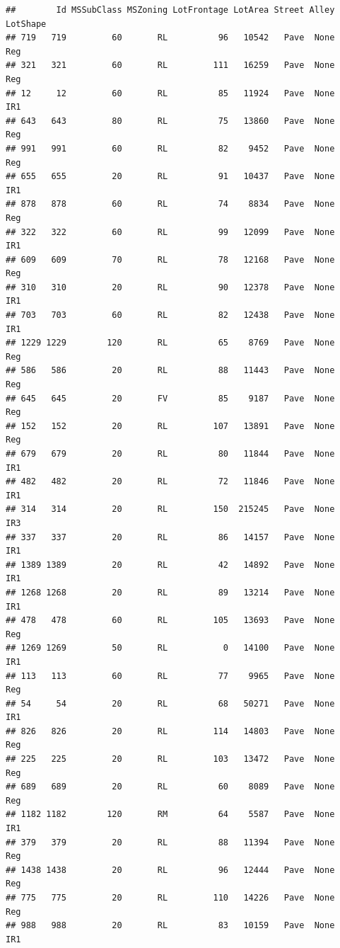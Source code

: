 \documentclass[]{article}
\begin{document}
\begin{verbatim}
##        Id MSSubClass MSZoning LotFrontage LotArea Street Alley LotShape
## 719   719         60       RL          96   10542   Pave  None      Reg
## 321   321         60       RL         111   16259   Pave  None      Reg
## 12     12         60       RL          85   11924   Pave  None      IR1
## 643   643         80       RL          75   13860   Pave  None      Reg
## 991   991         60       RL          82    9452   Pave  None      Reg
## 655   655         20       RL          91   10437   Pave  None      IR1
## 878   878         60       RL          74    8834   Pave  None      Reg
## 322   322         60       RL          99   12099   Pave  None      IR1
## 609   609         70       RL          78   12168   Pave  None      Reg
## 310   310         20       RL          90   12378   Pave  None      IR1
## 703   703         60       RL          82   12438   Pave  None      IR1
## 1229 1229        120       RL          65    8769   Pave  None      Reg
## 586   586         20       RL          88   11443   Pave  None      Reg
## 645   645         20       FV          85    9187   Pave  None      Reg
## 152   152         20       RL         107   13891   Pave  None      Reg
## 679   679         20       RL          80   11844   Pave  None      IR1
## 482   482         20       RL          72   11846   Pave  None      IR1
## 314   314         20       RL         150  215245   Pave  None      IR3
## 337   337         20       RL          86   14157   Pave  None      IR1
## 1389 1389         20       RL          42   14892   Pave  None      IR1
## 1268 1268         20       RL          89   13214   Pave  None      IR1
## 478   478         60       RL         105   13693   Pave  None      Reg
## 1269 1269         50       RL           0   14100   Pave  None      IR1
## 113   113         60       RL          77    9965   Pave  None      Reg
## 54     54         20       RL          68   50271   Pave  None      IR1
## 826   826         20       RL         114   14803   Pave  None      Reg
## 225   225         20       RL         103   13472   Pave  None      Reg
## 689   689         20       RL          60    8089   Pave  None      Reg
## 1182 1182        120       RM          64    5587   Pave  None      IR1
## 379   379         20       RL          88   11394   Pave  None      Reg
## 1438 1438         20       RL          96   12444   Pave  None      Reg
## 775   775         20       RL         110   14226   Pave  None      Reg
## 988   988         20       RL          83   10159   Pave  None      IR1

\end{verbatim}
\end{document}
